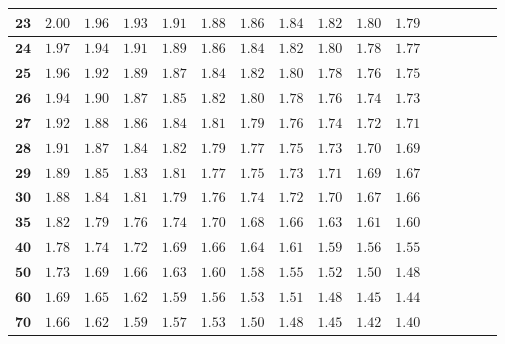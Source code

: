 \begin{customTableWrapper}{1.4}
\begin{longtable}{|r|r|r|r|r|r|r|r|r|r|r|r|r|r|r|r|}
    ${\mathbf{23}}$ & ${2.00}$   & ${1.96}$   & ${1.93}$   & ${1.91}$   & ${1.88}$   & ${1.86}$   & ${1.84}$   & ${1.82}$   & ${1.80}$   & ${1.79}$   \\ \hline 
    ${\mathbf{24}}$ & ${1.97}$   & ${1.94}$   & ${1.91}$   & ${1.89}$   & ${1.86}$   & ${1.84}$   & ${1.82}$   & ${1.80}$   & ${1.78}$   & ${1.77}$   \\ \hline 
    ${\mathbf{25}}$ & ${1.96}$   & ${1.92}$   & ${1.89}$   & ${1.87}$   & ${1.84}$   & ${1.82}$   & ${1.80}$   & ${1.78}$   & ${1.76}$   & ${1.75}$   \\ \hline 
    ${\mathbf{26}}$ & ${1.94}$   & ${1.90}$   & ${1.87}$   & ${1.85}$   & ${1.82}$   & ${1.80}$   & ${1.78}$   & ${1.76}$   & ${1.74}$   & ${1.73}$   \\ \hline 
    ${\mathbf{27}}$ & ${1.92}$   & ${1.88}$   & ${1.86}$   & ${1.84}$   & ${1.81}$   & ${1.79}$   & ${1.76}$   & ${1.74}$   & ${1.72}$   & ${1.71}$   \\ \hline 
    ${\mathbf{28}}$ & ${1.91}$   & ${1.87}$   & ${1.84}$   & ${1.82}$   & ${1.79}$   & ${1.77}$   & ${1.75}$   & ${1.73}$   & ${1.70}$   & ${1.69}$   \\ \hline 
    ${\mathbf{29}}$ & ${1.89}$   & ${1.85}$   & ${1.83}$   & ${1.81}$   & ${1.77}$   & ${1.75}$   & ${1.73}$   & ${1.71}$   & ${1.69}$   & ${1.67}$   \\ \hline 
    ${\mathbf{30}}$ & ${1.88}$   & ${1.84}$   & ${1.81}$   & ${1.79}$   & ${1.76}$   & ${1.74}$   & ${1.72}$   & ${1.70}$   & ${1.67}$   & ${1.66}$   \\ \hline 
    ${\mathbf{35}}$ & ${1.82}$   & ${1.79}$   & ${1.76}$   & ${1.74}$   & ${1.70}$   & ${1.68}$   & ${1.66}$   & ${1.63}$   & ${1.61}$   & ${1.60}$   \\ \hline 
    ${\mathbf{40}}$ & ${1.78}$   & ${1.74}$   & ${1.72}$   & ${1.69}$   & ${1.66}$   & ${1.64}$   & ${1.61}$   & ${1.59}$   & ${1.56}$   & ${1.55}$   \\ \hline 
    ${\mathbf{50}}$ & ${1.73}$   & ${1.69}$   & ${1.66}$   & ${1.63}$   & ${1.60}$   & ${1.58}$   & ${1.55}$   & ${1.52}$   & ${1.50}$   & ${1.48}$   \\ \hline 
    ${\mathbf{60}}$ & ${1.69}$   & ${1.65}$   & ${1.62}$   & ${1.59}$   & ${1.56}$   & ${1.53}$   & ${1.51}$   & ${1.48}$   & ${1.45}$   & ${1.44}$   \\ \hline 
    ${\mathbf{70}}$ & ${1.66}$   & ${1.62}$   & ${1.59}$   & ${1.57}$   & ${1.53}$   & ${1.50}$   & ${1.48}$   & ${1.45}$   & ${1.42}$   & ${1.40}$   \\ \hline 

\end{longtable}
\end{customTableWrapper}
